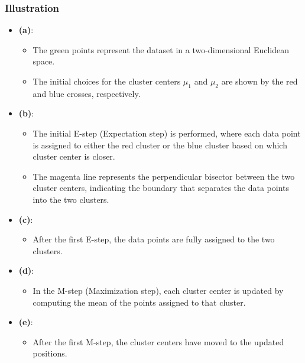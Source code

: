 \subsubsection{Illustration}
\begin{example}
    \begin{itemize}
        \item \textbf{(a)}: 
        \begin{itemize}
            \item The green points represent the dataset in a two-dimensional Euclidean space.
            \item The initial choices for the cluster centers \( \mu_1 \) and \( \mu_2 \) are shown by the red and blue crosses, respectively.
        \end{itemize}
        
        \item \textbf{(b)}:
        \begin{itemize}
            \item The initial E-step (Expectation step) is performed, where each data point is assigned to either the red cluster or the blue cluster based on which cluster center is closer.
            \item The magenta line represents the perpendicular bisector between the two cluster centers, indicating the boundary that separates the data points into the two clusters.
        \end{itemize}
        
        \item \textbf{(c)}:
        \begin{itemize}
            \item After the first E-step, the data points are fully assigned to the two clusters.
        \end{itemize}
        
        \item \textbf{(d)}:
        \begin{itemize}
            \item In the M-step (Maximization step), each cluster center is updated by computing the mean of the points assigned to that cluster.
        \end{itemize}
        
        \item \textbf{(e)}:
        \begin{itemize}
            \item After the first M-step, the cluster centers have moved to the updated positions.
        \end{itemize}
        

\end{itemize}
\end{example}
